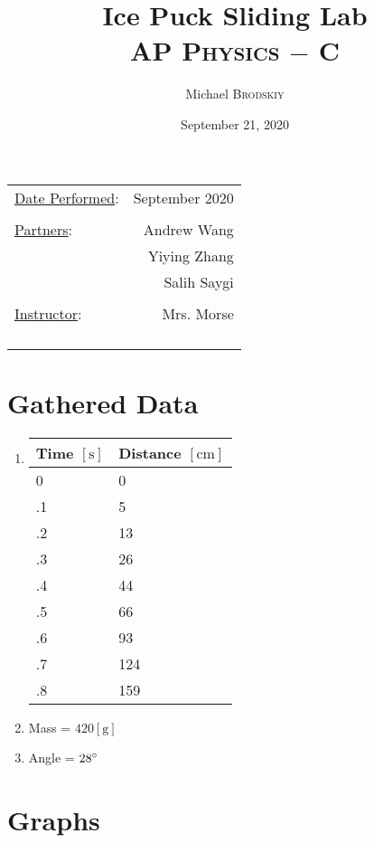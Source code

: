 \documentclass{article}
\title{Ice Puck Sliding Lab \\ AP \textsc{Physics} $-$ C}
\author{Michael \textsc{Brodskiy}}
\date{September 21, 2020}
\begin{document}
\maketitle
\begin{center}
\begin{tabular}{l r}
\underline{Date Performed}: & September 2020 \\\\ %
\underline{Partners}: & Andrew Wang \\ & Yiying Zhang \\ & Salih Saygi \\\\
\underline{Instructor}: & Mrs. Morse \\\\\\\\\\ %
\end{tabular}
\end{center}
\newpage
    
\section{Gathered Data}

\begin{enumerate}

  \item \begin{tabular}{|l|l|}

  \hline
  Time $[\si{\second}]$ & Distance $[\si{\centi\meter}]$ \\
  \hline
   0 & 0  \\
  \hline
  .1 & 5  \\
  \hline
  .2 & 13 \\
  \hline
  .3 & 26 \\
  \hline
  .4 & 44 \\
  \hline
  .5 & 66 \\
  \hline
  .6 & 93 \\
  \hline
  .7 & 124\\
  \hline
  .8 & 159\\
  \hline

\end{tabular}

\item Mass = $420[\si{\gram}]$

\item Angle = $28\degree$

\end{enumerate}

\section{Graphs}
\end{document}
